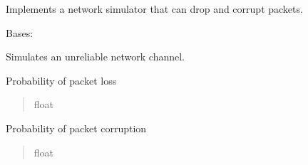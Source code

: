\documentclass[letterpaper,10pt,english]{sphinxmanual}
\begin{document}
\sphinxAtStartPar
Implements a network simulator that can drop and corrupt packets.

\begin{fulllineitems}
\label{\detokenize{network_simulator:network_simulator.NetworkSimulator}}
\pysigstartsignatures
\pysiglinewithargsret
{}
{\sphinxparamcomma {}\sphinxparamcomma {}\sphinxparamcomma {}}
{}
\pysigstopsignatures
\sphinxAtStartPar
Bases: 

\sphinxAtStartPar
Simulates an unreliable network channel.

\begin{fulllineitems}
\label{\detokenize{network_simulator:network_simulator.NetworkSimulator.loss_rate}}
\pysigstartsignatures
\pysigline
{}
\pysigstopsignatures
\sphinxAtStartPar
Probability of packet loss
\begin{quote}\begin{description}
\sphinxAtStartPar
float

\end{description}\end{quote}

\end{fulllineitems}


\begin{fulllineitems}
\label{\detokenize{network_simulator:network_simulator.NetworkSimulator.corruption_rate}}
\pysigstartsignatures
\pysigline
{}
\pysigstopsignatures
\sphinxAtStartPar
Probability of packet corruption
\begin{quote}\begin{description}
\sphinxAtStartPar
float


\end{description}
\end{quote}
\end{fulllineitems}
\end{fulllineitems}
\end{document}

